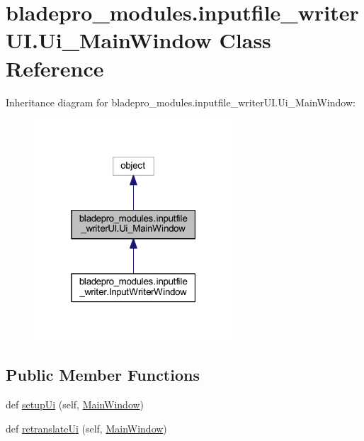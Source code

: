 \hypertarget{a00074}{}\section{bladepro\+\_\+modules.\+inputfile\+\_\+writer\+U\+I.\+Ui\+\_\+\+Main\+Window Class Reference}
\label{a00074}


Inheritance diagram for bladepro\+\_\+modules.\+inputfile\+\_\+writer\+U\+I.\+Ui\+\_\+\+Main\+Window\+:\nopagebreak
\begin{figure}[H]
\begin{center}
\leavevmode
\includegraphics[width=211pt]{a00073}
\end{center}
\end{figure}
\subsection*{Public Member Functions}
\begin{DoxyCompactItemize}
\item 
def \hyperlink{a00074_a77688f6f653ba2711e93269a03753754}{setup\+Ui} (self, \hyperlink{a00049_ab649489a40967421c06970ba9ffeef53}{Main\+Window})
\item 
def \hyperlink{a00074_a640f34d5228b66fcf4118eaa17edf8d6}{retranslate\+Ui} (self, \hyperlink{a00049_ab649489a40967421c06970ba9ffeef53}{Main\+Window})
\end{DoxyCompactItemize}
